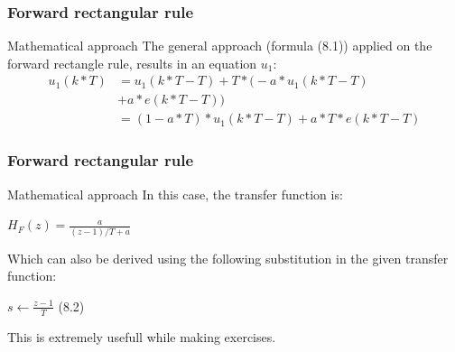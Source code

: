 \begin{frame}
	\frametitle{Forward rectangular rule}
	\begin{block}{Mathematical approach}
		The general approach (formula (8.1)) applied on the forward rectangle rule, results in an equation $u_1$:
		\begin{align*}
		u_1(k*T)& =u_1(k*T - T) + T*\big(-a*u_1(k*T - T)\\
		& + a*e(k*T - T) \big)\\
		& =(1 - a*T)*u_1(k*T - T) + a*T*e(k*T - T)
		\end{align*}
	\end{block}
\end{frame}

\begin{frame}
	\frametitle{Forward rectangular rule}
	\begin{block}{Mathematical approach}
		In this case, the transfer function is:
		\begin{center}
		$H_F(z) = \frac{a}{(z-1)/T+a}$
		\end{center}
		Which can also be derived using the following substitution in the given transfer function:
		\begin{center}
			$s \gets \frac{z-1}{T}$ (8.2)
		\end{center}
		This is extremely usefull while making exercises.
	\end{block}
\end{frame}	

